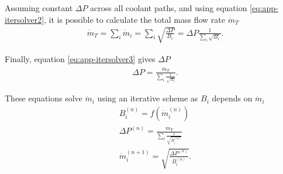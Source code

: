 Assuming constant $\Delta P$ across all coolant paths, and using equation \ref{eq:app-itersolver2}, it is possible to calculate the total mass flow rate $\dot{m}_T$
\begin{align}
  & \dot{m}_T = \sum_i \dot{m}_i = \sum_i \sqrt{\frac{\Delta P}{B_i}} = \Delta P \frac{1}{\sum_i \sqrt{B_i}}.
\end{align}

Finally, equation \ref{eq:app-itersolver3} gives $\Delta P$
\begin{align}
  & \Delta P = \frac{\dot{m}_T}{\sum_i \frac{1}{\sqrt{B_i}}}. \label{eq:app-itersolver3}
\end{align}

These equations solve $\dot{m}_i$ using an iterative scheme as $B_i$ depends on $\dot{m}_i$ \cite{melese_thermal_1984}
\begin{align}
  & B_i^{(n)} = f(\dot{m}_i^{(n)}) \\
  & \Delta P^{(n)} = \frac{\dot{m}_T}{\sum_i \frac{1}{\sqrt{B_i^{(n)}}}} \\
  & \dot{m}_i^{(n+1)} = \sqrt{\frac{\Delta P^{(n)}}{B_i^{(n)}}}.
\end{align}